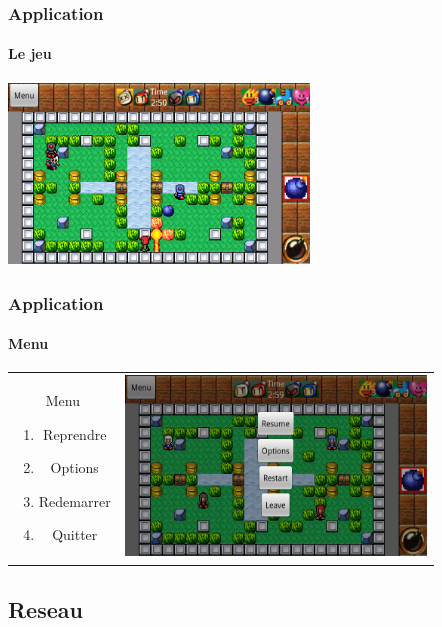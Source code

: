 		\begin{frame}
	\frametitle{Application}
	\framesubtitle{Le jeu}	
		\begin{center}
			\includegraphics[width=8cm]{img/game.png}
		\end{center}		
	
	\end{frame}
	
	\begin{frame}
	\frametitle{Application}
	\framesubtitle{Menu}
	
			\begin{tabular}{cc}
			\begin{minipage}{3cm}
				Menu
				\begin{enumerate}
					\item Reprendre
					\item Options
					\item Redemarrer
					\item Quitter
				\end{enumerate}
			\end{minipage} &
			\begin{minipage}{8cm}
				\includegraphics[width=8cm]{img/menusolo.png} 
			\end{minipage}\\
		\end{tabular}
	
	\end{frame}

\subsection{Reseau}

